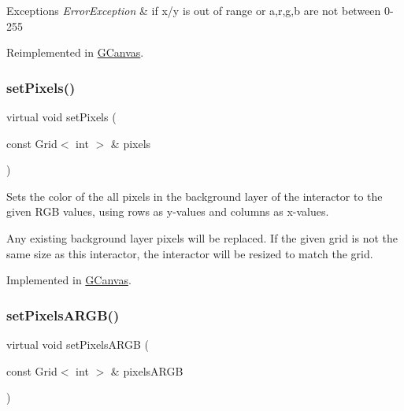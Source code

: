 \begin{DoxyExceptions}{Exceptions}
{\em Error\+Exception} & if x/y is out of range or a,r,g,b are not between 0-\/255 \\
\hline
\end{DoxyExceptions}


Reimplemented in \mbox{\hyperlink{classGCanvas_a2d22778c4fdce45bb2df60518000c5ad}{G\+Canvas}}.

\mbox{\label{classGDrawingSurface_aa80f4b7381bd418116baee600eed37fe}} 
\subsubsection{\texorpdfstring{set\+Pixels()}{setPixels()}}
{\footnotesize\ttfamily virtual void set\+Pixels (\begin{DoxyParamCaption}\item[{const Grid$<$ int $>$ \&}]{pixels }\end{DoxyParamCaption})\hspace{0.3cm}{\ttfamily [pure virtual]}}



Sets the color of the all pixels in the background layer of the interactor to the given R\+GB values, using rows as y-\/values and columns as x-\/values. 

Any existing background layer pixels will be replaced. If the given grid is not the same size as this interactor, the interactor will be resized to match the grid. 

Implemented in \mbox{\hyperlink{classGCanvas_ad151c93e985bb28b4f1207496c3ed024}{G\+Canvas}}.

\mbox{\label{classGDrawingSurface_a7d813f0f29751a217201f24cef402306}} 
\subsubsection{\texorpdfstring{set\+Pixels\+A\+R\+G\+B()}{setPixelsARGB()}}
{\footnotesize\ttfamily virtual void set\+Pixels\+A\+R\+GB (\begin{DoxyParamCaption}\item[{const Grid$<$ int $>$ \&}]{pixels\+A\+R\+GB }\end{DoxyParamCaption})\hspace{0.3cm}{\ttfamily [pure virtual]}}



